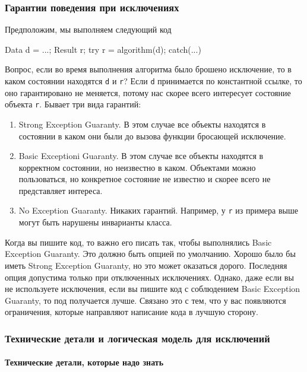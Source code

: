 \subsubsection{Гарантии поведения при исключениях}

Предположим, мы выполняем следующий код
\begin{cppcode}
Data d = ...;
Result r;
try {
  r = algorithm(d);
} catch(...) {
}
\end{cppcode}
Вопрос, если во время выполнения алгоритма было брошено исключение, то в каком состоянии находятся \verb"d" и \verb"r"?
Если \verb"d" принимается по константной ссылке, то оно гарантировано не меняется, потому нас скорее всего интересует состояние объекта \verb"r".
Бывает три вида гарантий:
\begin{enumerate}
\item Strong Exception Guaranty.
В этом случае все объекты находятся в состоянии в каком они были до вызова функции бросающей исключение.

\item Basic Exceptioni Guaranty.
В этом случае все объекты находятся в корректном состоянии, но неизвестно в каком.
Объектами можно пользоваться, но конкретное состояние не известно и скорее всего не представляет интереса.

\item No Exception Guaranty.
Никаких гарантий.
Например, у \verb"r" из примера выше могут быть нарушены инварианты класса.
\end{enumerate}
Когда вы пишите код, то важно его писать так, чтобы выполнялись Basic Exception Guaranty.
Это должно быть опцией по умолчанию.
Хорошо было бы иметь Strong Exception Guaranty, но это может оказаться дорого.
Последняя опция допустима только при отключенных исключениях.
Однако, даже если вы не используете исключения, если вы пишите код с соблюдением Basic Exception Guaranty, то под получается лучше.
Связано это с тем, что у вас появляются ограничения, которые направляют написание кода в лучшую сторону.

\subsubsection{Технические детали и логическая модель для исключений}

\paragraph{Технические детали, которые надо знать}
\label{section::ExceptionTechLogic}

